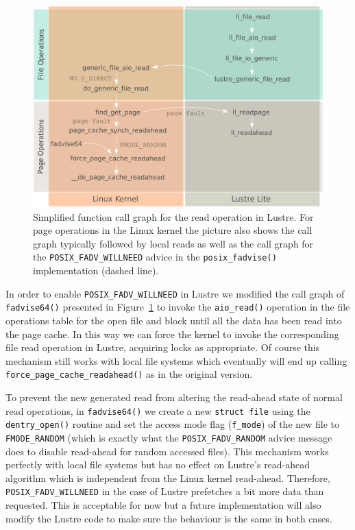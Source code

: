 \begin{figure}[!htb]
  \centering
  \includegraphics[width=\textwidth]{chapters/chapter2/figures/linux_lustre_1}
  \caption{Simplified function call graph for the read operation in Lustre. For page operations in the Linux kernel the picture also shows the call graph typically followed by local reads as well as the call graph for the \texttt{POSIX\_FADV\_WILLNEED} advice in 
  the \texttt{posix\_fadvise()} implementation (dashed line).}
  \label{figure: kernel}
\end{figure}

In order to enable \texttt{POSIX\_FADV\_WILLNEED} in Lustre we modified the call graph of \texttt{fadvise64()} presented in Figure~\ref{figure: kernel} to invoke the \texttt{aio\_read()} operation in the file operations table for the open file and block until 
all the data has been read into the page cache. In this way we can force the kernel to invoke the corresponding file read operation in Lustre, acquiring locks as appropriate. Of course this mechanism still works with local file systems which eventually will end 
up calling \texttt{force\_page\_cache\_readahead()} as in the original version.

To prevent the new generated read from altering the read-ahead state of normal read operations, in \texttt{fadvise64()} we create a new \texttt{struct file} using the \texttt{dentry\_open()} routine and set the access mode flag (\texttt{f\_mode}) of the new file 
to \texttt{FMODE\_RANDOM} (which is exactly what the \texttt{POSIX\_FADV\_RANDOM} advice message does to disable read-ahead for random accessed files). This mechanism works perfectly with local file systems but has no effect on Lustre's read-ahead algorithm which 
is independent from the Linux kernel read-ahead. Therefore, \texttt{POSIX\_FADV\_WILLNEED} in the case of Lustre prefetches a bit more data than requested. This is acceptable for now but a future implementation will also modify the Lustre code to make sure the 
behaviour is the same in both cases.

